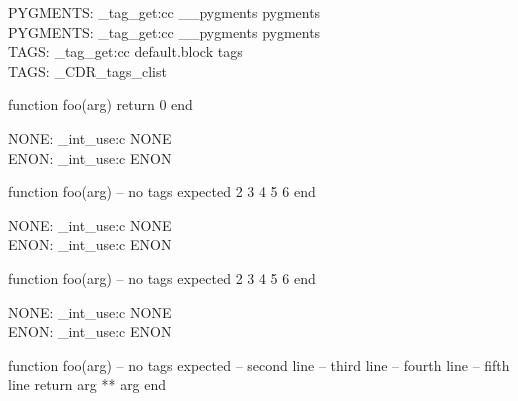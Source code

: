 \ExplSyntaxOn
PYGMENTS: \CDR_tag_get:cc { __pygments } { pygments } \\
\ExplSyntaxOff
{}
\ExplSyntaxOn
PYGMENTS: \CDR_tag_get:cc { __pygments } { pygments } \\
TAGS: \CDR_tag_get:cc { default.block } { tags } \\
TAGS: \g_CDR_tags_clist \\
\ExplSyntaxOff
\begin{CDRBlock}[
  stepnumber=1,
]
function foo(arg) return 0 end
\end{CDRBlock}

\ExplSyntaxOn
NONE: \CDR_int_use:c { NONE } \\
ENON: \CDR_int_use:c { ENON } \\
\ExplSyntaxOff

\begin{CDRBlock}[
  stepnumber=1,
  firstnumber = last,
]
function foo(arg) -- no tags expected
  2
  3
  4
  5
  6
end
\end{CDRBlock}

\ExplSyntaxOn
NONE: \CDR_int_use:c { NONE } \\
ENON: \CDR_int_use:c { ENON } \\
\ExplSyntaxOff

\begin{CDRBlock}[
  stepnumber=1,
  firstnumber = auto,
]
function foo(arg) -- no tags expected
  2
  3
  4
  5
  6
end
\end{CDRBlock}
\ExplSyntaxOn
NONE: \CDR_int_use:c { NONE } \\
ENON: \CDR_int_use:c { ENON } \\
\ExplSyntaxOff

\begin{CDRBlock}[
  pygments,
  lang=lua,
  numbers=none,
  debug,
  show tags=none,
  only top=false,
]
function foo(arg) -- no tags expected
  -- second line
  -- third line
  -- fourth line
  -- fifth line
  return arg ** arg
end
\end{CDRBlock}


